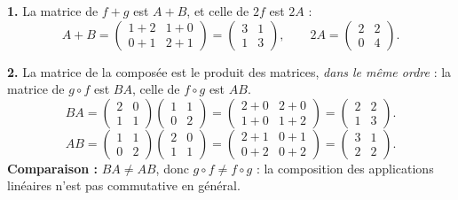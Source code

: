 \documentclass[11pt]{article}
\begin{document}
\begin{corrige}
\textbf{1.} La matrice de $f + g$ est $A + B$, et celle de $2f$ est $2A$ :
\[ A + B = \begin{pmatrix} 1+2 & 1+0 \\ 0+1 & 2+1 \end{pmatrix} = \begin{pmatrix} 3 & 1 \\ 1 & 3 \end{pmatrix}, \qquad 2A = \begin{pmatrix} 2 & 2 \\ 0 & 4 \end{pmatrix}. \]

\textbf{2.} La matrice de la composée est le produit des matrices, \emph{dans le même ordre} : la matrice de $g \circ f$ est $BA$, celle de $f \circ g$ est $AB$.
\[ BA = \begin{pmatrix} 2 & 0 \\ 1 & 1 \end{pmatrix}\begin{pmatrix} 1 & 1 \\ 0 & 2 \end{pmatrix} = \begin{pmatrix} 2+0 & 2+0 \\ 1+0 & 1+2 \end{pmatrix} = \begin{pmatrix} 2 & 2 \\ 1 & 3 \end{pmatrix}. \]
\[ AB = \begin{pmatrix} 1 & 1 \\ 0 & 2 \end{pmatrix}\begin{pmatrix} 2 & 0 \\ 1 & 1 \end{pmatrix} = \begin{pmatrix} 2+1 & 0+1 \\ 0+2 & 0+2 \end{pmatrix} = \begin{pmatrix} 3 & 1 \\ 2 & 2 \end{pmatrix}. \]
\textbf{Comparaison :} $BA \neq AB$, donc $g \circ f \neq f \circ g$ : la composition des applications linéaires n'est pas commutative en général.


\end{corrige}
\end{document}
